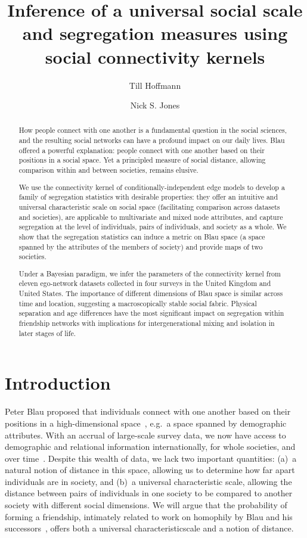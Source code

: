 \documentclass{scrartcl}
\title{Inference of a universal social scale and segregation measures using social connectivity kernels}
\author{Till Hoffmann}
\author{Nick S. Jones}
\affil{Department of Mathematics, Imperial College London}
\date{}
\begin{document}
\maketitle

\begin{abstract} %
    How people connect with one another is a fundamental question in the social sciences, and the resulting social networks can have a profound impact on our daily lives. Blau offered a powerful explanation: people connect with one another based on their positions in a social space. Yet a principled measure of social distance, allowing comparison within and between societies, remains elusive.

    We use the connectivity kernel of conditionally-independent edge models to develop a family of segregation statistics with desirable properties: they offer an intuitive and universal characteristic scale on social space (facilitating comparison across datasets and societies), are applicable to multivariate and mixed node attributes, and capture segregation at the level of individuals, pairs of individuals, and society as a whole. We show that the segregation statistics can induce a metric on Blau space (a space spanned by the attributes of the members of society) and provide maps of two societies.

    Under a Bayesian paradigm, we infer the parameters of the connectivity kernel from eleven ego-network datasets collected in four surveys in the United Kingdom and United States. The importance of different dimensions of Blau space is similar across time and location, suggesting a macroscopically stable social fabric. Physical separation and age differences have the most significant impact on segregation within friendship networks with implications for intergenerational mixing and isolation in later stages of life.
\end{abstract}

\section{Introduction\label{sec:introduction}}

Peter Blau proposed that individuals connect with one another based on their positions in a high-dimensional space~\cite{Blau1977}, e.g.\ a space spanned by demographic attributes. With an accrual of large-scale survey data, we now have access to demographic and relational information internationally, for whole societies, and over time~\cite{McPherson2001,McPherson2006,Mossong2008}. Despite this wealth of data, we lack two important quantities: (a)~a natural notion of distance in this space, allowing us to determine how far apart individuals are in society, and (b)~a universal characteristic scale, allowing the distance between pairs of individuals in one society to be compared to another society with different social dimensions. We will argue that the probability of forming a friendship, intimately related to work on homophily by Blau and his successors~\cite{McPherson2001}, offers both a universal characteristicscale and a notion of distance.
\end{document}
